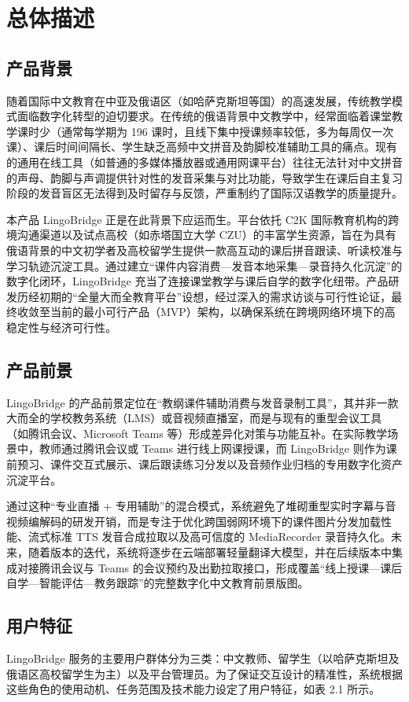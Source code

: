 \chapter{总体描述}

\section{产品背景}
随着国际中文教育在中亚及俄语区（如哈萨克斯坦等国）的高速发展，传统教学模式面临数字化转型的迫切要求。在传统的俄语背景中文教学中，经常面临着课堂教学课时少（通常每学期为 196 课时，且线下集中授课频率较低，多为每周仅一次课）、课后时间间隔长、学生缺乏高频中文拼音及韵脚校准辅助工具的痛点。现有的通用在线工具（如普通的多媒体播放器或通用网课平台）往往无法针对中文拼音的声母、韵脚与声调提供针对性的发音采集与对比功能，导致学生在课后自主复习阶段的发音盲区无法得到及时留存与反馈，严重制约了国际汉语教学的质量提升。

本产品 LingoBridge 正是在此背景下应运而生。平台依托 C2K 国际教育机构的跨境沟通渠道以及试点高校（如赤塔国立大学 CZU）的丰富学生资源，旨在为具有俄语背景的中文初学者及高校留学生提供一款高互动的课后拼音跟读、听读校准与学习轨迹沉淀工具。通过建立“课件内容消费---发音本地采集---录音持久化沉淀”的数字化闭环，LingoBridge 充当了连接课堂教学与课后自学的数字化纽带。产品研发历经初期的“全量大而全教育平台”设想，经过深入的需求访谈与可行性论证，最终收敛至当前的最小可行产品（MVP）架构，以确保系统在跨境网络环境下的高稳定性与经济可行性。

\section{产品前景}
LingoBridge 的产品前景定位在“教纲课件辅助消费与发音录制工具”，其并非一款大而全的学校教务系统（LMS）或音视频直播室，而是与现有的重型会议工具（如腾讯会议、Microsoft Teams 等）形成差异化对策与功能互补。在实际教学场景中，教师通过腾讯会议或 Teams 进行线上网课授课，而 LingoBridge 则作为课前预习、课件交互式展示、课后跟读练习分发以及音频作业归档的专用数字化资产沉淀平台。

通过这种“专业直播 + 专用辅助”的混合模式，系统避免了堆砌重型实时字幕与音视频编解码的研发开销，而是专注于优化跨国弱网环境下的课件图片分发加载性能、流式标准 TTS 发音合成拉取以及高可信度的 MediaRecorder 录音持久化。未来，随着版本的迭代，系统将逐步在云端部署轻量翻译大模型，并在后续版本中集成对接腾讯会议与 Teams 的会议预约及出勤拉取接口，形成覆盖“线上授课---课后自学---智能评估---教务跟踪”的完整数字化中文教育前景版图。

\section{用户特征}
LingoBridge 服务的主要用户群体分为三类：中文教师、留学生（以哈萨克斯坦及俄语区高校留学生为主）以及平台管理员。为了保证交互设计的精准性，系统根据这些角色的使用动机、任务范围及技术能力设定了用户特征，如表 2.1 所示。

